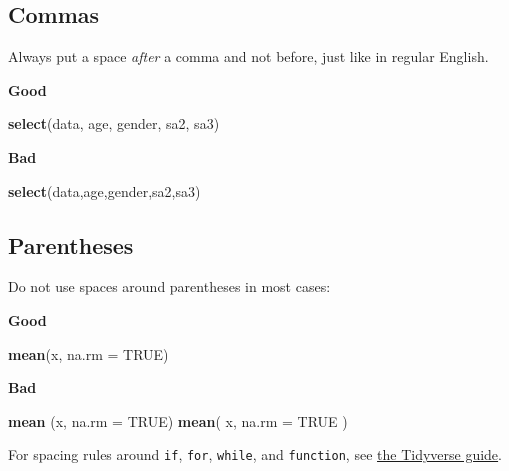 \documentclass[]{book}
\newenvironment{Shaded}{\begin{snugshade}}{\end{snugshade}}
\newcommand{\DataTypeTok}[1]{\textcolor[rgb]{0.13,0.29,0.53}{#1}}
\newcommand{\KeywordTok}[1]{\textcolor[rgb]{0.13,0.29,0.53}{\textbf{#1}}}
\newcommand{\NormalTok}[1]{#1}
\newcommand{\OtherTok}[1]{\textcolor[rgb]{0.56,0.35,0.01}{#1}}
\begin{document}
\hypertarget{commas}{%
\subsection{Commas}\label{commas}}

Always put a space \emph{after} a comma and not before, just like in regular English.

\textbf{Good}

\begin{Shaded}
\begin{Highlighting}[]
\KeywordTok{select}\NormalTok{(data, age, gender, sa2, sa3)}
\end{Highlighting}
\end{Shaded}

\textbf{Bad}

\begin{Shaded}
\begin{Highlighting}[]
\KeywordTok{select}\NormalTok{(data,age,gender,sa2,sa3)}
\end{Highlighting}
\end{Shaded}

\hypertarget{parentheses}{%
\subsection{Parentheses}\label{parentheses}}

Do not use spaces around parentheses in most cases:

\textbf{Good}

\begin{Shaded}
\begin{Highlighting}[]
\KeywordTok{mean}\NormalTok{(x, }\DataTypeTok{na.rm =} \OtherTok{TRUE}\NormalTok{)}
\end{Highlighting}
\end{Shaded}

\textbf{Bad}

\begin{Shaded}
\begin{Highlighting}[]
\KeywordTok{mean}\NormalTok{ (x, }\DataTypeTok{na.rm =} \OtherTok{TRUE}\NormalTok{)}
\KeywordTok{mean}\NormalTok{( x, }\DataTypeTok{na.rm =} \OtherTok{TRUE}\NormalTok{ )}
\end{Highlighting}
\end{Shaded}

For spacing rules around \texttt{if}, \texttt{for}, \texttt{while}, and \texttt{function}, see \href{https://style.tidyverse.org/syntax.html\#parentheses}{the Tidyverse guide}.
\end{document}
